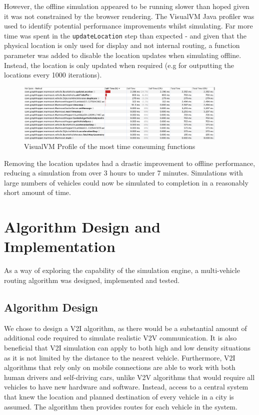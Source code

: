 \documentclass[ %
                    author={Alexander Hill},
                supervisor={Dr. Benjamin Sach},
                    degree={MEng},
                     title={MARMOSET},
                  subtitle={Multi-Agent Route Management using Online Simulation for Efficient Transportation},
                      type={research},
                      year={2016} ]{dissertation}
\begin{document}
However, the offline simulation appeared to be running slower than hoped given
it was not constrained by the browser rendering. The VisualVM Java profiler was
used to identify potential performance improvements whilst simulating.  Far more
time was spent in the \texttt{updateLocation} step than expected - and given
that the physical location is only used for display and not internal routing, a
function parameter was added to disable the location updates when simulating
offline.  Instead, the location is only updated when required (e.g for
outputting the locations every 1000 iterations).

\begin{figure}[h]
    \centering
    \includegraphics[width=0.9\textwidth,clip,trim=0 7cm 0 0]{visualvm-profile}
    \caption{VisualVM Profile of the most time consuming functions}\label{fig:visualvm}
\end{figure}

Removing the location updates had a drastic improvement to offline performance,
reducing a simulation from over 3 hours to under 7 minutes. Simulations with
large numbers of vehicles could now be simulated to completion in a reasonably
short amount of time.

\section{Algorithm Design and Implementation}

As a way of exploring the capability of the simulation engine, a multi-vehicle
routing algorithm was designed, implemented and tested.

\subsection{Algorithm Design}\label{sec:algo}

We chose to design a V2I algorithm, as there would be a substantial amount of
additional code required to simulate realistic V2V communication. It is also
beneficial that V2I simulation can apply to both high and low density situations
as it is not limited by the distance to the nearest vehicle. Furthermore, V2I
algorithms that rely only on mobile connections are able to work with both human
drivers and self-driving cars, unlike V2V algorithms that would require all
vehicles to have new hardware and software.  Instead, access to a central system
that knew the location and planned destination of every vehicle in a city is
assumed. The algorithm then provides routes for each vehicle in the system.
\end{document}
